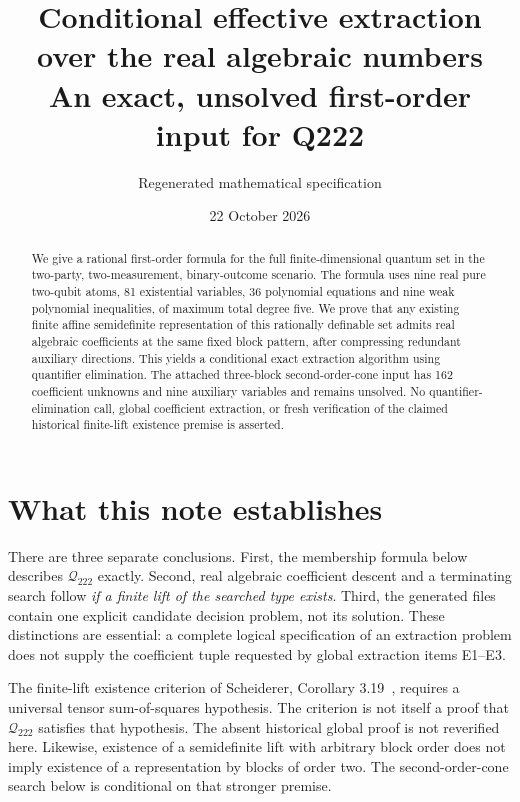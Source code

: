 \documentclass[11pt]{article}
\title{Conditional effective extraction over the real algebraic numbers\\An exact, unsolved first-order input for Q222}
\author{Regenerated mathematical specification}
\date{22 October 2026}
\newcommand{\Q}{{\mathcal Q_{222}}}
\begin{document}
\maketitle

\begin{abstract}
We give a rational first-order formula for the full finite-dimensional quantum set in the two-party, two-measurement, binary-outcome scenario. The formula uses nine real pure two-qubit atoms, 81 existential variables, 36 polynomial equations and nine weak polynomial inequalities, of maximum total degree five. We prove that any existing finite affine semidefinite representation of this rationally definable set admits real algebraic coefficients at the same fixed block pattern, after compressing redundant auxiliary directions. This yields a conditional exact extraction algorithm using quantifier elimination. The attached three-block second-order-cone input has 162 coefficient unknowns and nine auxiliary variables and remains unsolved. No quantifier-elimination call, global coefficient extraction, or fresh verification of the claimed historical finite-lift existence premise is asserted.
\end{abstract}

\section{What this note establishes}
There are three separate conclusions. First, the membership formula below describes $\Q$ exactly. Second, real algebraic coefficient descent and a terminating search follow \emph{if a finite lift of the searched type exists}. Third, the generated files contain one explicit candidate decision problem, not its solution. These distinctions are essential: a complete logical specification of an extraction problem does not supply the coefficient tuple requested by global extraction items E1--E3.

The finite-lift existence criterion of Scheiderer, Corollary 3.19~\cite{Scheiderer}, requires a universal tensor sum-of-squares hypothesis. The criterion is not itself a proof that $\Q$ satisfies that hypothesis. The absent historical global proof is not reverified here. Likewise, existence of a semidefinite lift with arbitrary block order does not imply existence of a representation by blocks of order two. The second-order-cone search below is conditional on that stronger premise.
\end{document}
